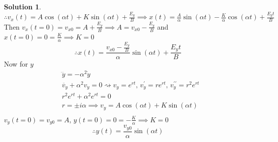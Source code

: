 \documentclass[10pt]{article}
\theoremstyle{definition}
\newtheorem{soln}{Solution}
\begin{document}
\begin{soln}
      $\therefore\displaystyle v_x(t)=A\cos\left(\alpha t\right)+K\sin\left(\alpha t\right)+\frac{E_y}{B}\implies x(t)=\frac{A}{\alpha}\sin\left(\alpha t\right)-\frac{K}{\alpha}\cos\left(\alpha t\right)+\frac{E_yt}{B}$\\
      Then $v_x(t=0)=v_{x0}=A+\frac{E_y}{B}\implies A=v_{x0}-\frac{E_y}{B}$ and $x(t=0)=0=\frac{K}{\alpha}\implies K=0$\\
      $$\therefore x(t)=\frac{v_{x0}-\displaystyle\frac{E_y}{B}}{\alpha}\sin\left(\alpha t\right)+\frac{E_yt}{B}$$
      Now for $y$
      \begin{align*}
             & \dddot{y}=-\alpha^2\dot{y}                                                                                \\
             & \ddot{v_y}+\alpha^2v_y=0\rightsquigarrow v_y=e^{rt},\, v_y^\prime=re^{rt},\, v_y^{\prime\prime}=r^2e^{rt} \\
             & r^2e^{rt}+\alpha^2e^{rt}=0                                                                                \\
             & r=\pm i\alpha\implies v_y=A\cos\left(\alpha t\right)+K\sin\left(\alpha t\right)                           \\
      \end{align*}
      $v_y(t=0)=v_{y0}=A$, $y(t=0)=0=-\frac{K}{\alpha}\implies K=0$
      $$\therefore y(t)=\frac{v_{y0}}{\alpha}\sin\left(\alpha t\right)$$
\end{soln}
\newpage
\end{document}

